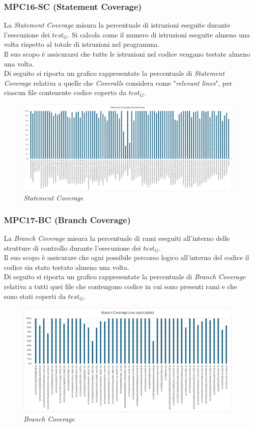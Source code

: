 \subsubsection{MPC16-SC (Statement Coverage)}
La \textit{Statement Coverage} misura la percentuale di istruzioni eseguite durante l'esecuzione dei $\textit{test}_G$. Si calcola come il numero di istruzioni eseguite almeno una volta rispetto al totale di istruzioni nel programma. \\
Il suo scopo è assicurarsi che tutte le istruzioni nel codice vengano testate almeno una volta. \\
Di seguito si riporta un grafico rappresentate la percentuale di \textit{Statement Coverage} relativa a quelle che \textit{Coveralls} considera come "\textit{relevant lines}", per ciascun file contenente codice coperto da $\textit{test}_G$. 
\begin{figure}[H]
    \centering
    \includegraphics[scale = 0.4]{grafici/Statement_Coverage.png}
    \caption{\textit{Statement Coverage}}
\end{figure}
\subsubsection{MPC17-BC (Branch Coverage)}
La \textit{Branch Coverage} misura la percentuale di rami eseguiti all'interno delle strutture di controllo durante l'esecuzione dei $\textit{test}_G$. \\
Il suo scopo è assicurare che ogni possibile percorso logico all'interno del codice il codice sia stato testato almeno una volta. \\
Di seguito si riporta un grafico rappresentate la percentuale di \textit{Branch Coverage} relativa a tutti quei file che contengono codice in cui sono presenti rami e che sono stati coperti da $\textit{test}_G$. 
\begin{figure}[H]
    \centering
    \includegraphics[scale = 0.6]{grafici/Branch_Coverage.png}
    \caption{\textit{Branch Coverage}}
\end{figure}

